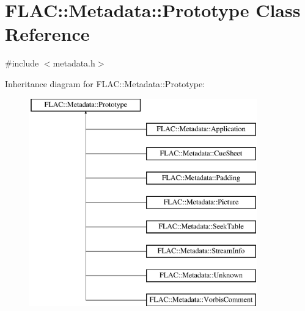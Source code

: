 \hypertarget{class_f_l_a_c_1_1_metadata_1_1_prototype}{}\section{F\+L\+AC\+:\+:Metadata\+:\+:Prototype Class Reference}
\label{class_f_l_a_c_1_1_metadata_1_1_prototype}


{\ttfamily \#include $<$metadata.\+h$>$}

Inheritance diagram for F\+L\+AC\+:\+:Metadata\+:\+:Prototype\+:\begin{figure}[H]
\begin{center}
\leavevmode
\includegraphics[height=9.000000cm]{class_f_l_a_c_1_1_metadata_1_1_prototype}
\end{center}
\end{figure}

